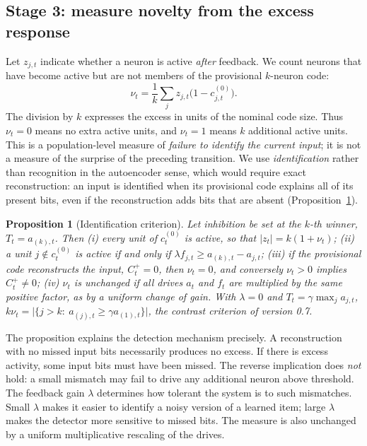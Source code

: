 \documentclass[11pt,a4paper]{article}
\newtheorem{proposition}{Proposition}
\begin{document}
\subsection{Stage 3: measure novelty from the excess response}\label{sec:novelty}
Let $z_{j,t}$ indicate whether a neuron is active \emph{after} feedback. We count neurons that have become active but are not members of the provisional $k$-neuron code:
\begin{equation}
 \nu_t=\frac1k\sum_j z_{j,t}\big(1-c^{(0)}_{j,t}\big).
 \label{eq:novelty}
\end{equation}
The division by $k$ expresses the excess in units of the nominal code size. Thus $\nu_t=0$ means no extra active units, and $\nu_t=1$ means $k$ additional active units. This is a population-level measure of \emph{failure to identify the current input}; it is not a measure of the surprise of the preceding transition. We use \emph{identification} rather than recognition in the autoencoder sense, which would require exact reconstruction: an input is identified when its provisional code explains all of its present bits, even if the reconstruction adds bits that are absent (Proposition~\ref{prop:ident}).

\begin{proposition}[Identification criterion]\label{prop:ident}
Let inhibition be set at the $k$-th winner, $T_t=a_{(k),t}$. Then (i) every unit of $c^{(0)}_t$ is active, so that $|z_t|=k(1+\nu_t)$; (ii) a unit $j\notin c^{(0)}_t$ is active if and only if $\lambda f_{j,t}\ge a_{(k),t}-a_{j,t}$; (iii) if the provisional code reconstructs the input, $C^+_t=0$, then $\nu_t=0$, and conversely $\nu_t>0$ implies $C^+_t\ne0$; (iv) $\nu_t$ is unchanged if all drives $a_t$ and $f_t$ are multiplied by the same positive factor, as by a uniform change of gain. With $\lambda=0$ and $T_t=\gamma\max_ja_{j,t}$, $k\nu_t=\big|\{j>k:\ a_{(j),t}\ge\gamma a_{(1),t}\}\big|$, the contrast criterion of version 0.7.
\end{proposition}

The proposition explains the detection mechanism precisely. A reconstruction with no missed input bits necessarily produces no excess. If there is excess activity, some input bits must have been missed. The reverse implication does \emph{not} hold: a small mismatch may fail to drive any additional neuron above threshold. The feedback gain $\lambda$ determines how tolerant the system is to such mismatches. Small $\lambda$ makes it easier to identify a noisy version of a learned item; large $\lambda$ makes the detector more sensitive to missed bits. The measure is also unchanged by a uniform multiplicative rescaling of the drives.
\end{document}
